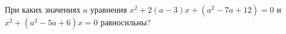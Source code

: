 \begin{ex}
	\begin{condition}
		При каких значениях \( a \) уравнения \( x^2+2(a-3)x+(a^2-7a+12)=0 \) и \( x^2+(a^2-5a+6)x=0 \) равносильны?
	\end{condition}
\end{ex}